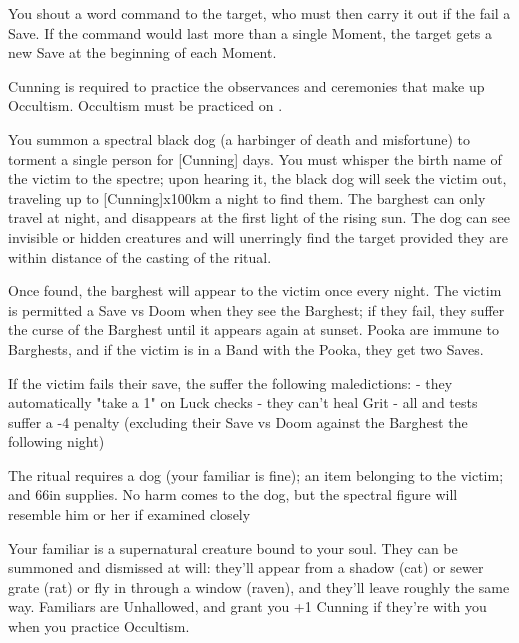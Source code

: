 {You shout a \DICE word command to the target, who must then carry it out if the fail a Save.  If the command would last more than a single Moment, the target gets a new Save at the beginning of each Moment.



\newpage




Cunning is required to practice the observances and ceremonies that make up Occultism.   Occultism must be practiced on .

\OCCULT[
  Name=Barghest,
  Link=occultism-barghest,
  Success=10+,
  Cost=66\AG (plus see below)
]

You summon a spectral black dog (a harbinger of death and misfortune) to torment a single person for [Cunning] days.  You must whisper the birth name of the victim to the spectre; upon hearing it, the black dog will seek the victim out, traveling up to [Cunning]x100km a night to find them.  The barghest can only travel at night, and disappears at the first light of the rising sun.  The dog can see invisible or hidden creatures and will unerringly find the target provided they are within distance of the casting of the ritual.

Once found, the barghest will appear to the victim once every night.  The victim is permitted a Save vs Doom when they see the Barghest; if they fail, they suffer the curse of the Barghest until it appears again at sunset.  Pooka are immune to Barghests, and if the victim is in a Band with the Pooka, they get two Saves.

If the victim fails their save, the suffer the following maledictions:
- they automatically "take a 1" on Luck checks
- they can't heal Grit
- all \RO and \RB tests suffer a -4 penalty (excluding their Save vs Doom against the Barghest the following night)

The ritual requires a dog (your familiar is fine); an item belonging to the victim; and 66\AG in supplies.  No harm comes to the dog, but the spectral figure will resemble him or her if examined closely


\OCCULT[
  Name=Bind Familiar,
  Link=occultism-bind-familiar,
  Success=5+,
  Cost=666\FE
]

Your familiar is a supernatural creature bound to your soul.  They can be summoned and dismissed at will: they'll appear from a shadow (cat) or sewer grate (rat) or fly in through a window (raven), and they'll leave roughly the same way.  Familiars are Unhallowed, and grant you +1 Cunning if they're with you when you practice Occultism.  

}
